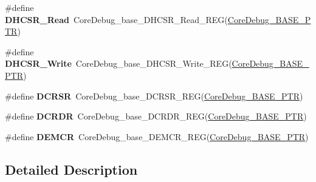 \begin{DoxyCompactItemize}
\item 
\hypertarget{group___core_debug___register___accessor___macros_ga7d77eafe76b2000c7159e58e11ade9a1}{}\#define {\bfseries D\+H\+C\+S\+R\+\_\+\+Read}~Core\+Debug\+\_\+base\+\_\+\+D\+H\+C\+S\+R\+\_\+\+Read\+\_\+\+R\+E\+G(\hyperlink{group___core_debug___peripheral_ga994a185afca30ede538d89322c4f0326}{Core\+Debug\+\_\+\+B\+A\+S\+E\+\_\+\+P\+T\+R})\label{group___core_debug___register___accessor___macros_ga7d77eafe76b2000c7159e58e11ade9a1}

\item 
\hypertarget{group___core_debug___register___accessor___macros_ga3c374ff0f88587d03fd707ebc0a06169}{}\#define {\bfseries D\+H\+C\+S\+R\+\_\+\+Write}~Core\+Debug\+\_\+base\+\_\+\+D\+H\+C\+S\+R\+\_\+\+Write\+\_\+\+R\+E\+G(\hyperlink{group___core_debug___peripheral_ga994a185afca30ede538d89322c4f0326}{Core\+Debug\+\_\+\+B\+A\+S\+E\+\_\+\+P\+T\+R})\label{group___core_debug___register___accessor___macros_ga3c374ff0f88587d03fd707ebc0a06169}

\item 
\hypertarget{group___core_debug___register___accessor___macros_gabd5ddab120c0e09c0198d49c25713be3}{}\#define {\bfseries D\+C\+R\+S\+R}~Core\+Debug\+\_\+base\+\_\+\+D\+C\+R\+S\+R\+\_\+\+R\+E\+G(\hyperlink{group___core_debug___peripheral_ga994a185afca30ede538d89322c4f0326}{Core\+Debug\+\_\+\+B\+A\+S\+E\+\_\+\+P\+T\+R})\label{group___core_debug___register___accessor___macros_gabd5ddab120c0e09c0198d49c25713be3}

\item 
\hypertarget{group___core_debug___register___accessor___macros_gaaa7a4f8f79faea1305f3398257c656a0}{}\#define {\bfseries D\+C\+R\+D\+R}~Core\+Debug\+\_\+base\+\_\+\+D\+C\+R\+D\+R\+\_\+\+R\+E\+G(\hyperlink{group___core_debug___peripheral_ga994a185afca30ede538d89322c4f0326}{Core\+Debug\+\_\+\+B\+A\+S\+E\+\_\+\+P\+T\+R})\label{group___core_debug___register___accessor___macros_gaaa7a4f8f79faea1305f3398257c656a0}

\item 
\hypertarget{group___core_debug___register___accessor___macros_gab6c5b1baf444f12ba50bfc3b0e40e05c}{}\#define {\bfseries D\+E\+M\+C\+R}~Core\+Debug\+\_\+base\+\_\+\+D\+E\+M\+C\+R\+\_\+\+R\+E\+G(\hyperlink{group___core_debug___peripheral_ga994a185afca30ede538d89322c4f0326}{Core\+Debug\+\_\+\+B\+A\+S\+E\+\_\+\+P\+T\+R})\label{group___core_debug___register___accessor___macros_gab6c5b1baf444f12ba50bfc3b0e40e05c}

\end{DoxyCompactItemize}


\subsection{Detailed Description}
